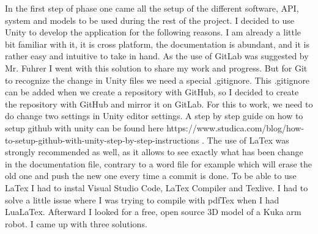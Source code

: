 \documentclass{scrartcl}
\begin{document}
In the first step of phase one came all the setup of the different software, API, 
system and models to be used during the rest of the project. I decided to use Unity to develop the application for the following reasons.
I am already a little bit familiar with it, it is cross platform, the documentation is abundant, 
and it is rather easy and intuitive to take in hand. As the use of GitLab was suggested by Mr. Fuhrer 
I went with this solution to share my work and progress. But for Git to recognize the change in Unity 
files we need a special .gitignore. This .gitignore can be added when we create a repository with GitHub, 
so I decided to create the repository with GitHub and mirror it on GitLab. For this to work, we need to do 
change two settings in Unity editor settings. A step by step guide on how to setup github with unity 
can be found here https://www.studica.com/blog/how-to-setup-github-with-unity-step-by-step-instructions . 
The use of LaTex was strongly recommended as well, as it allows to see exactly what has been change in the documentation file, 
contrary to a word file for example which will erase the old one and push the new one every time a commit is done. 
To be able to use LaTex I had to instal Visual Studio Code, LaTex Compiler and Texlive. 
I had to solve a little issue where I was trying to compile with pdfTex when I had LuaLaTex. 
Afterward I looked for a free, open source 3D model of a Kuka arm robot. I came up with three solutions.
\end{document}
